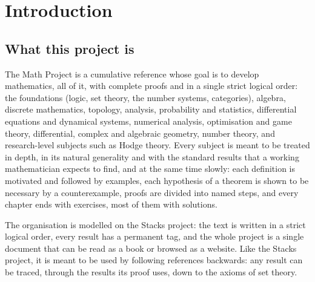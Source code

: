 \chapter{Introduction}\label{introduction}

\section{What this project is}\label{introduction:section-aim}

The Math Project is a cumulative reference whose goal is to develop
mathematics, all of it, with complete proofs and in a single strict logical
order: the foundations (logic, set theory, the number systems, categories),
algebra, discrete mathematics, topology, analysis, probability and statistics,
differential equations and dynamical systems, numerical analysis, optimisation
and game theory, differential, complex and algebraic geometry, number theory,
and research-level subjects such as Hodge theory. Every subject is meant to be
treated in depth, in its natural generality and with the standard results that
a working mathematician expects to find, and at the same time slowly: each
definition is motivated and followed by examples, each hypothesis of a theorem
is shown to be necessary by a counterexample, proofs are divided into named
steps, and every chapter ends with exercises, most of them with solutions.

The organisation is modelled on the Stacks project: the text is written in a
strict logical order, every result has a permanent tag, and the whole project
is a single document that can be read as a book or browsed as a website. Like
the Stacks project, it is meant to be used by following references backwards:
any result can be traced, through the results its proof uses, down to the
axioms of set theory.

